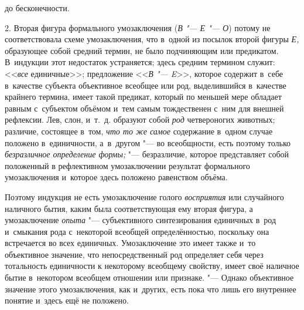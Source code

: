 {\centering
до бесконечности.
\par}

2. Вторая фигура формального умозаключения
({\em В "--- Е "--- О}) потому не соответствовала схеме
умозаключения, что в~одной из посылок второй фигуры
{\em Е,} образующее собой
средний термин, не было подчиняющим или предикатом. В~индукции этот
недостаток устраняется; здесь средним термином служит:
<<{\em все} единичные>>;
предложение <<{\em В "--- E}>>,
которое содержит в~себе в~качестве субъекта объективное
всеобщее или род, выделившийся в~качестве крайнего термина, имеет такой
предикат, который по меньшей мере обладает равным с~субъектом объёмом и~тем
самым тождественен с~ним для внешней рефлексии. Лев, слон, и~т.~д. образуют
собой {\em род} четвероногих животных; различие, состоящее в~том,
{\em что то же самое} содержание в~одном случае положено в~единичности,
а~в~другом "--- во всеобщности, есть поэтому только
{\em безразличное определение формы;}
"--- безразличие, которое представляет собой положенный в
рефлективном умозаключении результат формального умозаключения и~которое
здесь положено равенством объёма.

Поэтому индукция не есть умозаключение голого
{\em восприятия} или
случайного наличного бытия, каким была соответствующая ему вторая фигура, а
умозаключение {\em опыта}
"--- субъективного синтезирования единичных в~род и~смыкания
рода с~некоторой всеобщей определённостью, поскольку она встречается во
всех единичных. Умозаключение это имеет также и~то объективное значение,
что непосредственный род определяет себя через тотальность единичности к
некоторому всеобщему свойству, имеет своё наличное бытие в~некотором
всеобщем отношении или признаке. "--- Однако объективное
значение этого умозаключения, как и~других, есть пока что лишь его
внутреннее понятие и~здесь ещё не положено.

